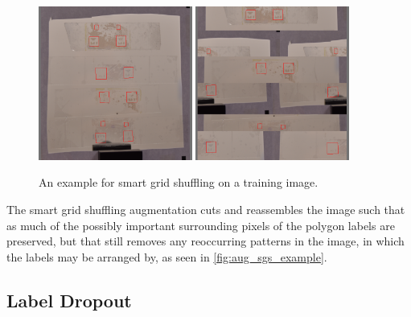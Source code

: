 \documentclass[10pt]{book}
\newcommand{\figureref}[1]{\autoref{#1}}
\begin{document}
\begin{figure}
  \centering
     {\includegraphics[width=0.45\textwidth]{image/aug_sgs_before}}
     {\includegraphics[width=0.45\textwidth]{image/aug_sgs_after}}
  \caption{An example for smart grid shuffling on a training image.}
  \label{fig:aug_sgs_example}
\end{figure}

The smart grid shuffling augmentation cuts and reassembles the image such that as much of the possibly important surrounding pixels of the polygon labels are preserved, but that still removes any reoccurring patterns in the image, in which the labels may be arranged by, as seen in \figureref{fig:aug_sgs_example}.

\subsection{Label Dropout}
\label{sec:aug_ld}
\end{document}
